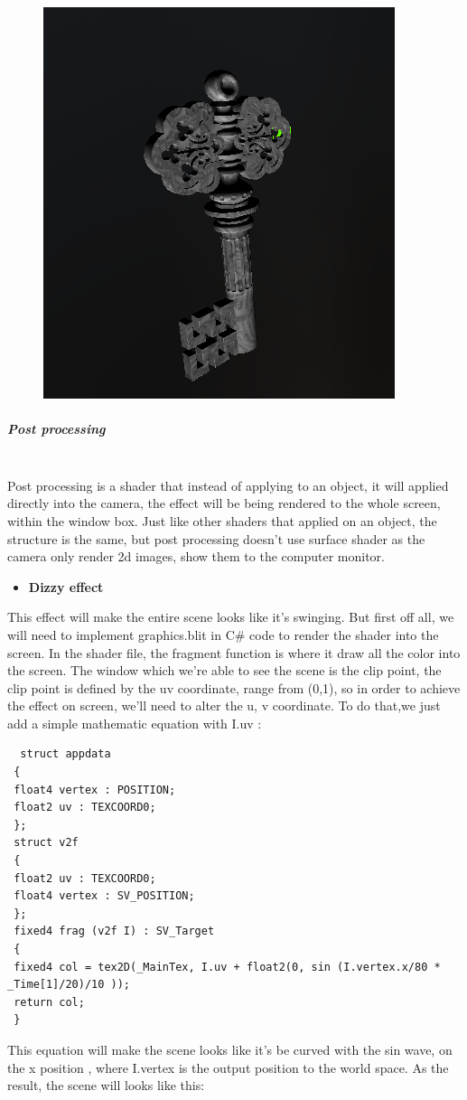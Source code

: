 \documentclass[a4paper, 13pt]{extarticle}
\begin{document}
{\begin{figure}[h]
			\begin{minipage}{1\textwidth}
				\centering
				\includegraphics[width=0.3\linewidth]{intructions/light_react.png}
				\centering
			\end{minipage}
	\end{figure}
\subparagraph{Post processing} ~\\
Post processing is a shader that instead of applying to an object, it will applied directly into the camera, the effect will be being rendered to the whole screen, within the window box. Just like other shaders that applied on an object, the structure is the same, but post processing doesn't use surface shader as the camera only render 2d images, show them to the computer monitor.
\begin{itemize}
	\item \bfseries Dizzy effect 
\end{itemize} 
 This effect will make the entire scene looks like it's swinging. But first off all, we will need to implement graphics.blit in C\# code to render the shader into the screen. In the shader file, the fragment function is where it draw all the color into the screen. The window which we're able to see the scene is the clip point, the clip point is defined by the uv coordinate, range from (0,1), so in order to achieve the effect on screen, we'll need to alter the u, v coordinate. To do that,we just add a simple mathematic equation with I.uv : 
 \begin{lstlisting}
  struct appdata
 {
 float4 vertex : POSITION;
 float2 uv : TEXCOORD0;
 };
 struct v2f
 {
 float2 uv : TEXCOORD0;
 float4 vertex : SV_POSITION;
 };
 fixed4 frag (v2f I) : SV_Target
 {
 fixed4 col = tex2D(_MainTex, I.uv + float2(0, sin (I.vertex.x/80 * _Time[1]/20)/10 ));
 return col;
 }
 \end{lstlisting} 
 This equation will make the scene looks like it's be curved with the sin wave, on the x position , where I.vertex is the output position to the world space. As the result, the scene will looks like this: 
 \newpage
 ~
 \begin{figure}[h] 

\end{figure}}
\end{document}
